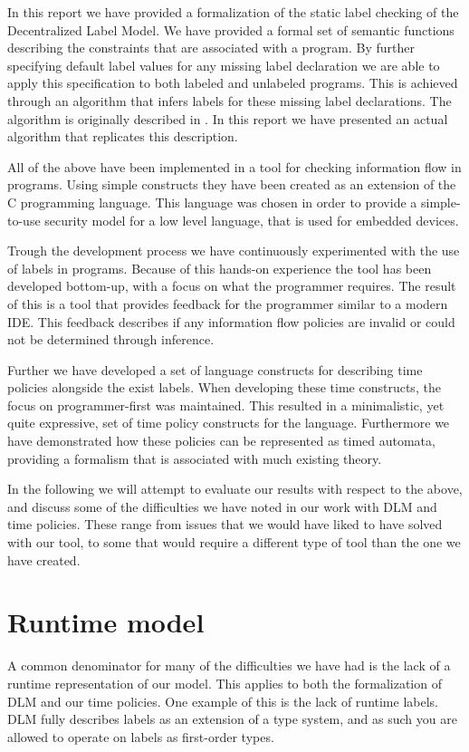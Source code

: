 In this report we have provided a formalization of the static label checking of the Decentralized Label Model.
We have provided a formal set of semantic functions describing the constraints that are associated with a program.
By further specifying default label values for any missing label declaration we are able to apply this specification to both labeled and unlabeled programs.
This is achieved through an algorithm that infers labels for these missing label declarations.
The algorithm is originally described in \cite{myers1997}.
In this report we have presented an actual algorithm that replicates this description.

All of the above have been implemented in a tool for checking information flow in programs.
Using simple constructs they have been created as an extension of the C programming language.
This language was chosen in order to provide a simple-to-use security model for a low level language, that is used for embedded devices.

Trough the development process we have continuously experimented with the use of labels in programs.
Because of this hands-on experience the tool has been developed bottom-up, with a focus on what the programmer requires.
The result of this is a tool that provides feedback for the programmer similar to a modern IDE.
This feedback describes if any information flow policies are invalid or could not be determined through inference.

Further we have developed a set of language constructs for describing time policies alongside the exist labels.
When developing these time constructs, the focus on programmer-first was maintained.
This resulted in a minimalistic, yet quite expressive, set of time policy constructs for the language.
Furthermore we have demonstrated how these policies can be represented as timed automata, providing a formalism that is associated with much existing theory.

In the following we will attempt to evaluate our results with respect to the above, and discuss some of the difficulties we have noted in our work with DLM and time policies.
These range from issues that we would have liked to have solved with our tool, to some that would require a different type of tool than the one we have created.

\section{Runtime model}
A common denominator for many of the difficulties we have had is the lack of a runtime representation of our model.
This applies to both the formalization of DLM and our time policies.
One example of this is the lack of runtime labels.
DLM fully describes labels as an extension of a type system, and as such you are allowed to operate on labels as first-order types.

